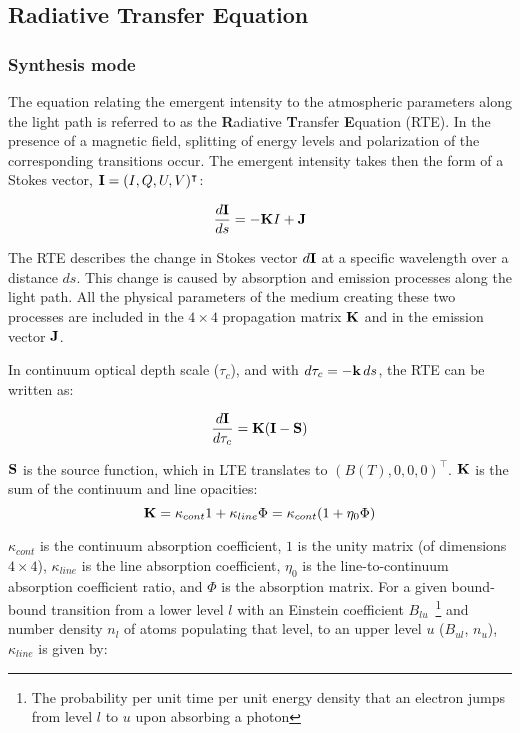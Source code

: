 \documentclass[goettingen, gauss, print]{thesis}
\begin{document}

\newpage
\subsection{Radiative Transfer Equation}
\label{intro-RT}

\subsubsection{Synthesis mode}
The equation relating the emergent intensity to the atmospheric parameters along the light path is referred to as the \textbf{R}adiative \textbf{T}ransfer \textbf{E}quation (RTE). In the presence of a magnetic field, splitting of energy levels and polarization of the corresponding transitions occur. The emergent intensity takes then the form of a Stokes vector, $\bold{I}=(I,Q,U,V)^\intercal$:

\begin{equation}
\frac{d\bold{I}}{ds} = -\bold{K}I + \bold{J}
\end{equation}

The RTE describes the change in Stokes vector $d\bold{I}$ at a specific wavelength  over a distance $ds$. This change is caused by absorption and emission processes along the light path. All the physical parameters of the medium creating these two processes are included in the $4\times 4$ propagation matrix $\bold{K}$ and in the emission vector $\bold{J}$.

In continuum optical depth scale ($\tau_c$), and with $d\tau_c = - \bold{k}\, ds$, the RTE can be written as:

\begin{equation}
\frac{d\bold{I}}{d\tau_c} = \bold{K} (\bold{I}-\bold{S} )
\end{equation}


$\bold{S}$ is the source function, which in LTE translates to $(B(T),0,0,0)^\intercal$. 
$\bold{K}$ is the sum of the continuum and line opacities:
\begin{equation}
\bold{K} = \kappa_{cont} 1+ \kappa_{line} \Phi = \kappa_{cont} (1 + \eta_0 \Phi )
\end{equation}

$\kappa_{cont}$ is the continuum absorption coefficient, $1$ is the unity matrix (of dimensions $4\times 4$), $\kappa_{line}$ is the line absorption coefficient, $\eta_0$ is the line-to-continuum absorption coefficient ratio, and $\Phi$ is the absorption matrix. For a given bound-bound transition from a lower level $l$ with an Einstein coefficient $B_{lu}$~\footnote{The probability per unit time per unit energy density that an electron jumps from level $l$ to $u$ upon absorbing a photon} and number density $n_l$ of atoms populating that level, to an upper level $u$ ($B_{ul}$, $n_u$), $\kappa_{line}$ is given by:
\end{document}
